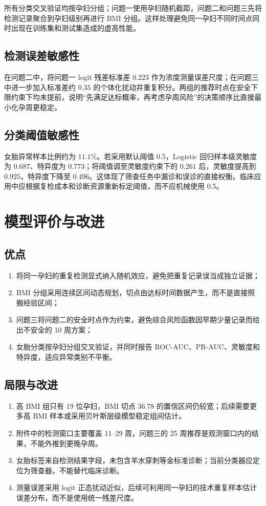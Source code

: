 \documentclass[UTF8,a4paper,12pt]{ctexart}
\begin{document}
所有分类交叉验证均按孕妇分组；问题一使用孕妇随机截距，问题二和问题三先将检测记录聚合到孕妇级别再进行 BMI 分组。这样处理避免同一孕妇不同时间点同时出现在训练集和测试集造成的虚高性能。

\subsection{检测误差敏感性}

在问题二中，将问题一 logit 残差标准差 $0.223$ 作为浓度测量误差尺度；在问题三中进一步加入标准差约 $0.35$ 的个体化扰动并重复积分。两组的推荐时点在安全下限约束下均未提前，说明“先满足达标概率，再考虑孕周风险”的决策顺序比直接最小化孕周更稳定。

\subsection{分类阈值敏感性}

女胎异常样本比例约为 $11.1\%$。若采用默认阈值 0.5，Logistic 回归样本级灵敏度为 $0.687$、特异度为 $0.773$；将阈值调至灵敏度约束下的 $0.261$ 后，灵敏度提高到 $0.925$，特异度下降至 $0.496$。这体现了筛查任务中漏诊和误诊的直接权衡。临床应用中应根据复检成本和诊断资源重新标定阈值，而不应机械使用 0.5。

\section{模型评价与改进}

\subsection{优点}
\begin{enumerate}[label=(\arabic*),leftmargin=3em]
  \item 将同一孕妇的重复检测显式纳入随机效应，避免把重复记录误当成独立证据；
  \item BMI 分组采用连续区间动态规划，切点由达标时间数据产生，而不是直接照搬经验区间；
  \item 问题三将问题二的安全时点作为约束，避免综合风险函数因早期少量记录而给出不安全的 10 周方案；
  \item 女胎分类按孕妇分组交叉验证，并同时报告 ROC-AUC、PR-AUC、灵敏度和特异度，适应异常类别不平衡。
\end{enumerate}

\subsection{局限与改进}
\begin{enumerate}[label=(\arabic*),leftmargin=3em]
  \item 高 BMI 组只有 19 位孕妇，BMI 切点 $36.78$ 的置信区间仍较宽；后续需要更多高 BMI 样本或采用贝叶斯层级模型稳定组间估计。
  \item 附件中的检测窗口主要覆盖 11--29 周，问题三的 25 周推荐是观测窗口内的结果，不能外推到更晚孕周。
  \item 女胎标签来自检测结果字段，未包含羊水穿刺等金标准诊断；当前分类器应定位为筛查器，不能替代临床诊断。
  \item 测量误差采用 logit 正态扰动近似，后续可利用同一孕妇的技术重复样本估计误差分布，而不是使用统一残差尺度。
\end{enumerate}
\end{document}
